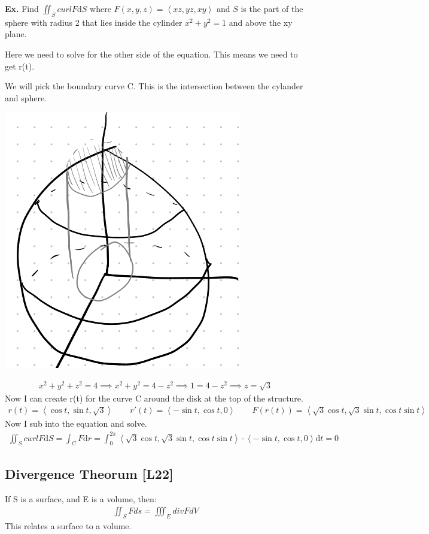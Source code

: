 \documentclass[12pt,letterpaper]{article} \usepackage{amsmath} \usepackage{graphicx} \usepackage[margin=1in]{geometry} \usepackage{longtable}  \usepackage{amssymb}
\begin{document}
	\begin{mdframed}[]
	\textbf{Ex. } Find $\iint_S curl F \mathrm{d}S$ where $F(x,y,z) = \left<xz,yz,xy\right>$ and $S$ is the part of the sphere with radius 2 that lies inside the cylinder $x^2 + y^2 = 1$ and above the xy plane. 
	
	Here we need to solve for the other side of the equation. This means we need to get r(t). 
	
	We will pick the boundary curve C. This is the intersection between the cylander and sphere.
	\begin{center}
		\includegraphics[width=0.3\linewidth]{ex5}
	\end{center}
	\begin{align*}
		x^2 + y^2 + z^2 = 4 \implies x^2 + y^2 = 4-z^2 \implies 1 = 4-z^2 \implies z=\sqrt 3
	\end{align*}
	Now I can create r(t) for the curve C around the disk at the top of the structure. 
	\begin{align*}
		r(t) = \left<\cos t, \sin t, \sqrt 3\right> \qquad r'(t) = \left<-\sin t, \cos t, 0\right> \qquad F(r(t)) = \left<\sqrt 3 \cos t, \sqrt 3 \sin t, \cos t \sin t\right>
	\end{align*}
	Now I sub into the equation and solve. 
	\begin{align*}
		\iint_S curl F \mathrm{d}S = \int_C F \mathrm{d}r = \int _0^{2\pi} \left<\sqrt 3 \cos t, \sqrt 3 \sin t, \cos t \sin t\right> \cdot \left<-\sin t, \cos t, 0\right> \mathrm{d}t = 0
	\end{align*}
	\end{mdframed}
	
	\subsection{Divergence Theorum [L22]}
	If S is a surface, and E is a volume, then: 
	\begin{align*}
		\iint_S Fds = \iiint_E div F dV
	\end{align*}
	This relates a surface to a volume.
	
\end{document}
